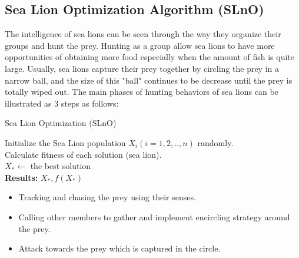 \documentclass[../main.tex]{subfiles}
\begin{document}
\subsection{Sea Lion Optimization Algorithm (SLnO)}
\label{slno_standard} 
	
	The intelligence of sea lions can be seen through the way they organize their groups and hunt the prey. Hunting as a group allow sea lions to have more opportunities of obtaining more food especially when the amount of fish is quite large. Usually, sea lions capture their prey together by circling the prey in a narrow ball, and the size of this "ball" continues to be decrease until the prey is totally wiped out. The main phases of hunting behaviors of sea lions can be illustrated as 3 steps as follows:
	
\begin{algorithm}[!t]
\caption{Sea Lion Optimization (SLnO)}
\label{algorithm_slno}
\SetAlgoLined
 Initialize the Sea Lion population $X_i (i=1,2,.., n)$ randomly. \\
 Calculate fitness of each solution (sea lion). \\
 $X_*\gets$ the best solution \\
 \textbf{Results:}  $X_*, f(X_*)$
\end{algorithm}
	
\begin{itemize}
\item Tracking and chasing the prey using their senses.
\item Calling other members to gather and implement encircling strategy around the prey.
\item Attack towards the prey which is captured in the circle.
\end{itemize}
\end{document}

